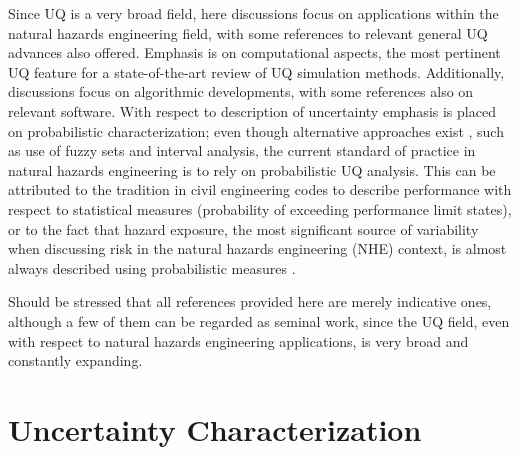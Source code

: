 Since UQ is a very broad field, here discussions focus on applications within the natural hazards engineering field, with some references to relevant general UQ advances also offered. Emphasis is on computational aspects, the most pertinent UQ feature for a state-of-the-art review of UQ simulation methods. Additionally, discussions focus on algorithmic developments, with some references also on relevant software. With respect to description of uncertainty emphasis is placed on probabilistic characterization; even though alternative approaches exist \citep{beer2013imprecise}, such as use of fuzzy sets and interval analysis, the current standard of practice in natural hazards engineering is to rely on probabilistic UQ analysis. This can be attributed to the tradition in civil engineering codes to describe performance with respect to statistical measures (probability of exceeding performance limit states), or to the fact that hazard exposure, the most significant source of variability when discussing risk in the natural hazards engineering (NHE) context, is almost always described using probabilistic measures \citep{mcguire2004seismic, resio2007white}. 

Should be stressed that all references provided here are merely indicative ones, although a few of them can be regarded as seminal work, since the UQ field, even with respect to natural hazards engineering applications, is very broad and constantly expanding.    

\section{Uncertainty Characterization}
\label{sec:uq_characterization}

